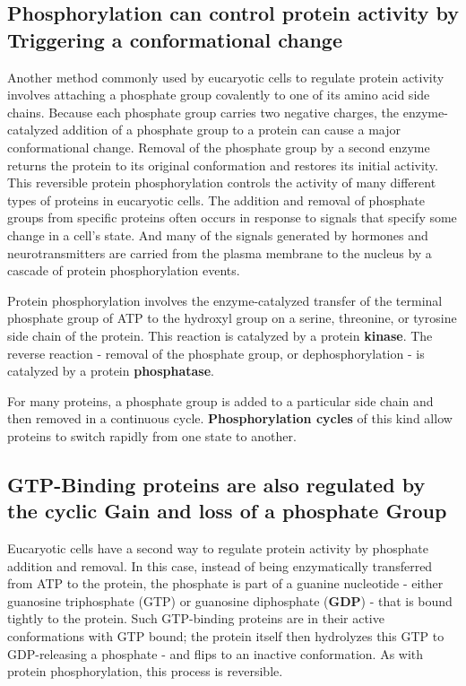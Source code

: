 \subsection{Phosphorylation can control protein activity by Triggering a conformational change}

Another method commonly used by eucaryotic cells to regulate protein
activity involves attaching a phosphate group covalently to one of
its amino acid side chains. Because each phosphate group carries two
negative charges, the enzyme-catalyzed addition of a phosphate group
to a protein can cause a major conformational change.
Removal of the phosphate group by a second enzyme returns the protein to its original
conformation and restores its initial activity.
This reversible protein phosphorylation controls the activity of many
different types of proteins in eucaryotic cells.
The addition and removal of phosphate groups from specific proteins
often occurs in response to signals that specify some change in a cell’s
state. And many of the signals generated by hormones and neurotransmitters are
carried from the plasma membrane to the nucleus by a cascade of protein
phosphorylation events.

Protein phosphorylation involves the enzyme-catalyzed transfer of the
terminal phosphate group of ATP to the hydroxyl group on a serine, threonine,
or tyrosine side chain of the protein. This reaction is catalyzed by a
protein \textbf{kinase}. The reverse reaction - removal of the phosphate group,
or dephosphorylation - is catalyzed by a protein \textbf{phosphatase}.

For many proteins, a phosphate group is added to a particular side
chain and then removed in a continuous cycle. \textbf{Phosphorylation cycles}
of this kind allow proteins to switch rapidly from one state to another.

\subsection{GTP-Binding proteins are also regulated by the cyclic Gain and loss of a phosphate Group}

Eucaryotic cells have a second way to regulate protein activity by phosphate
addition and removal. In this case, instead of being enzymatically
transferred from ATP to the protein, the phosphate is part of a guanine
nucleotide - either guanosine triphosphate (GTP) or guanosine diphosphate
(\textbf{GDP}) - that is bound tightly to the protein. Such GTP-binding
proteins are in their active conformations with GTP bound; the protein
itself then hydrolyzes this GTP to GDP-releasing a phosphate - and flips
to an inactive conformation. As with protein phosphorylation, this process is reversible.

